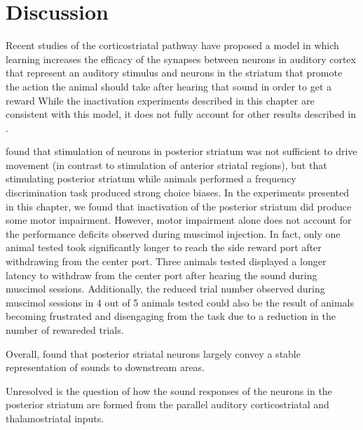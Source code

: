 \section{Discussion}

Recent studies of the corticostriatal pathway have proposed a model in which learning increases the efficacy of the synapses between neurons in auditory cortex that represent an auditory stimulus and neurons in the striatum that promote the action the animal should take after hearing that sound in order to get a reward \citep{Znamenskiy2013, Xiong2015} %
%
While the inactivation experiments described in this chapter are consistent with this model,  it does not fully account for other results described in \citet{Guo2018}.
%

\citet{Guo2018} found that stimulation of neurons in posterior striatum was not sufficient to drive movement (in contrast to stimulation of anterior striatal regions), but that stimulating posterior striatum while animals performed a frequency discrimination task produced strong choice biases.
%
In the experiments presented in this chapter, we found that inactivation of the posterior striatum did produce some motor impairment.
%
However, motor impairment alone does not account for the performance deficits
observed during muscimol injection.
%
In fact, only one animal tested took significantly longer to reach the side
reward port after withdrawing from the center port.
%
Three animals tested displayed a longer latency to withdraw from the center port
after hearing the sound during muscimol sessions. 
%
Additionally, the reduced trial number observed during muscimol sessions in 4 out of 5 animals tested could also be the result of animals becoming frustrated and disengaging from the task due to a reduction in the number of rewareded trials.



Overall, \citet{Guo2018} found that posterior striatal neurons largely convey a stable representation of sounds to downstream areas.

Unresolved is the question of how the sound responses of the neurons in the posterior striatum are formed from the parallel auditory corticostriatal and thalamostriatal inputs.
%

